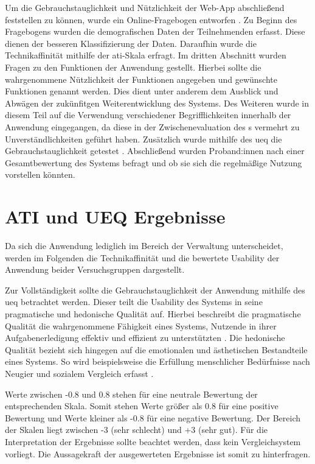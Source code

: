 Um die Gebrauchstauglichkeit und Nützlichkeit der Web-App abschließend
feststellen zu können, wurde ein Online-Fragebogen entworfen . Zu Beginn des Fragebogens wurden die demografischen Daten der
Teilnehmenden erfasst. Diese dienen der besseren Klassifizierung der Daten.
Daraufhin wurde die Technikaffinität mithilfe der \ac{ati}-Skala erfragt. Im
dritten Abschnitt wurden Fragen zu den Funktionen der Anwendung gestellt.
Hierbei sollte die wahrgenommene Nützlichkeit der Funktionen angegeben und
gewünschte Funktionen genannt werden. Dies dient unter anderem dem Ausblick und
Abwägen der zukünfitgen Weiterentwicklung des Systems. Des Weiteren wurde in
diesem Teil auf die Verwendung verschiedener Begrifflichkeiten innerhalb der
Anwendung eingegangen, da diese in der Zwischenevaluation des
s vermehrt zu Unverständlichkeiten geführt haben.
Zusätzlich wurde mithilfe des \ac{ueq} die Gebrauchstauglichkeit getestet
\cite{burghardt_mensch_2018}. Abschließend wurden Proband:innen nach einer
Gesamtbewertung des Systems befragt und ob sie sich die regelmäßige Nutzung
vorstellen könnten.



\section{ATI und UEQ Ergebnisse}
Da sich die Anwendung lediglich im Bereich der Verwaltung unterscheidet, werden im
Folgenden die Technikaffinität und die bewertete Usability der Anwendung beider
Versuchsgruppen dargestellt.

Zur Vollständigkeit sollte die Gebrauchstauglichkeit der Anwendung mithilfe des \ac{ueq} betrachtet
werden. Dieser teilt die Usability des Systems in seine pragmatische und hedonische Qualität auf.
Hierbei beschreibt die pragmatische Qualität die wahrgenommene Fähigkeit eines Systems, Nutzende in
ihrer Aufgabenerledigung effektiv und effizient zu unterstützten \cite{hassenzahl_thing_2004}. Die
hedonische Qualität bezieht sich hingegen auf die emotionalen und ästhetischen Bestandteile eines
Systems. So wird beispielsweise die Erfüllung menschlicher Bedürfnisse nach Neugier und sozialem
Vergleich erfasst \cite{hassenzahl_thing_2004}.

Werte zwischen -0.8 und 0.8 stehen für eine neutrale Bewertung der entsprechenden Skala. Somit
stehen Werte größer als 0.8 für eine positive Bewertung und Werte kleiner als -0.8 für eine negative
Bewertung. Der Bereich der Skalen liegt zwischen -3 (sehr schlecht) und +3 (sehr gut). Für die
Interpretation der Ergebnisse sollte beachtet werden, dass kein Vergleichsystem vorliegt. Die
Aussagekraft der ausgewerteten Ergebnisse ist somit zu hinterfragen.

